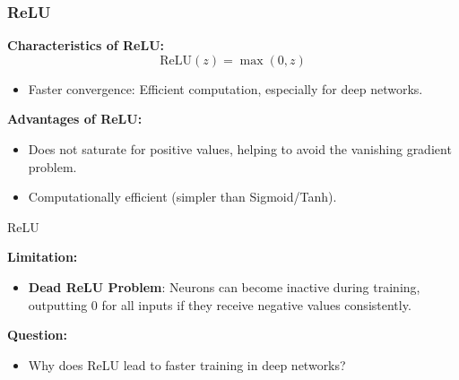 \documentclass[serif, aspectratio=169]{beamer}
\begin{document}
\begin{frame}
    \frametitle{ReLU}
    \textbf{Characteristics of ReLU:}
     \begin{equation*}
      \text{ReLU}(z) = \max(0, z) 
       \end{equation*}
       \begin{itemize}
           \item Faster convergence: Efficient computation, especially for deep networks.
       \end{itemize}
    \textbf{Advantages of ReLU:}
    \begin{itemize}
        \item Does not saturate for positive values, helping to avoid the vanishing gradient problem.
        \item Computationally efficient (simpler than Sigmoid/Tanh).
    \end{itemize}

    \begin{center}
    \end{center}
\end{frame}
\begin{frame}{ReLU}

    \textbf{Limitation:}
    \begin{itemize}
        \item \textbf{Dead ReLU Problem}: Neurons can become inactive during training, outputting 0 for all inputs if they receive negative values consistently.
    \end{itemize}

    \textbf{Question:}
    \begin{itemize}
        \item Why does ReLU lead to faster training in deep networks?
    \end{itemize}

\end{frame}
\end{document}
